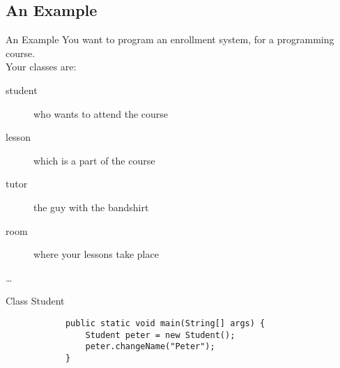 	\subsection{An Example}
	
	\begin{frame}{An Example}
		You want to program an enrollment system, for a programming course. \\
		\vspace{1em}
		Your classes are:\\
		\begin{description}
			\item[student] who wants to attend the course
			\item[lesson] which is a part of the course
			\item[tutor] the guy with the bandshirt
			\item[room] where your lessons take place
			\item[\dots]
		\end{description}
	\end{frame}
	
	
	\begin{frame}[fragile]{Class Student}
		\begin{lstlisting}
			public static void main(String[] args) {
				Student peter = new Student();
				peter.changeName("Peter");
			}
		\end{lstlisting}
	\end{frame}
	
